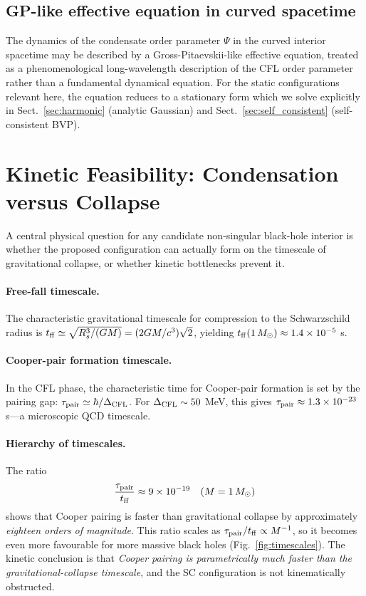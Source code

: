 \documentclass[epj]{svjour}
\begin{document}
\subsection{GP-like effective equation in curved spacetime}
\label{sec:GP_equation}

The dynamics of the condensate order parameter $\Psi$ in the curved interior spacetime may be described by a Gross-Pitaevskii-like effective equation, treated as a phenomenological long-wavelength description of the CFL order parameter rather than a fundamental dynamical equation. For the static configurations relevant here, the equation reduces to a stationary form which we solve explicitly in Sect.~\ref{sec:harmonic} (analytic Gaussian) and Sect.~\ref{sec:self_consistent} (self-consistent BVP).

\section{Kinetic Feasibility: Condensation versus Collapse}
\label{sec:kinetics}

A central physical question for any candidate non-singular black-hole interior is whether the proposed configuration can actually form on the timescale of gravitational collapse, or whether kinetic bottlenecks prevent it.

\paragraph{Free-fall timescale.}
The characteristic gravitational timescale for compression to the Schwarzschild radius is $t_{\rm ff} \simeq \sqrt{R_s^3/(GM)} = (2GM/c^3)\sqrt{2}$, yielding $t_{\rm ff}(1\,M_\odot) \approx 1.4 \times 10^{-5}$ s.

\paragraph{Cooper-pair formation timescale.}
In the CFL phase, the characteristic time for Cooper-pair formation is set by the pairing gap: $\tau_{\rm pair} \simeq \hbar/\Delta_{\rm CFL}$. For $\Delta_{\rm CFL} \sim 50$ MeV, this gives $\tau_{\rm pair} \approx 1.3 \times 10^{-23}$ s---a microscopic QCD timescale.

\paragraph{Hierarchy of timescales.}
The ratio
\begin{equation}
\frac{\tau_{\rm pair}}{t_{\rm ff}} \approx 9 \times 10^{-19}\quad (M = 1\,M_\odot)
\end{equation}
shows that Cooper pairing is faster than gravitational collapse by approximately \emph{eighteen orders of magnitude}. This ratio scales as $\tau_{\rm pair}/t_{\rm ff} \propto M^{-1}$, so it becomes even more favourable for more massive black holes (Fig.~\ref{fig:timescales}). The kinetic conclusion is that \emph{Cooper pairing is parametrically much faster than the gravitational-collapse timescale}, and the SC configuration is not kinematically obstructed.
\end{document}
